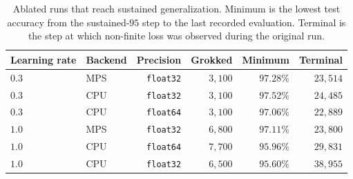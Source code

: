 \begin{table}[t]
\centering\small
\caption{Ablated runs that reach sustained generalization. Minimum is the lowest test
accuracy from the sustained-$95$ step to the last recorded evaluation. Terminal is the step
at which non-finite loss was observed during the original run.}
\label{tab:nons}
\begin{tabular}{llrrrr}
\toprule
Learning rate & Backend & Precision & Grokked & Minimum & Terminal \\
\midrule
$0.3$ & MPS & \texttt{float32} & $3{,}100$ & $97.28\%$ & $23{,}514$ \\
$0.3$ & CPU & \texttt{float32} & $3{,}100$ & $97.52\%$ & $24{,}485$ \\
$0.3$ & CPU & \texttt{float64} & $3{,}100$ & $97.06\%$ & $22{,}889$ \\
$1.0$ & MPS & \texttt{float32} & $6{,}800$ & $97.11\%$ & $23{,}800$ \\
$1.0$ & CPU & \texttt{float64} & $7{,}700$ & $95.96\%$ & $29{,}831$ \\
$1.0$ & CPU & \texttt{float32} & $6{,}500$ & $95.60\%$ & $38{,}955$ \\
\bottomrule
\end{tabular}
\end{table}
